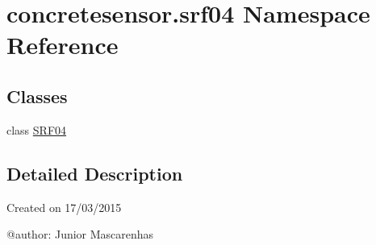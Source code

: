 \hypertarget{namespaceconcretesensor_1_1srf04}{}\section{concretesensor.\+srf04 Namespace Reference}
\label{namespaceconcretesensor_1_1srf04}
\subsection*{Classes}
\begin{DoxyCompactItemize}
\item 
class \hyperlink{classconcretesensor_1_1srf04_1_1SRF04}{S\+R\+F04}
\end{DoxyCompactItemize}


\subsection{Detailed Description}
\begin{DoxyVerb}Created on 17/03/2015

@author: Junior Mascarenhas
\end{DoxyVerb}
 